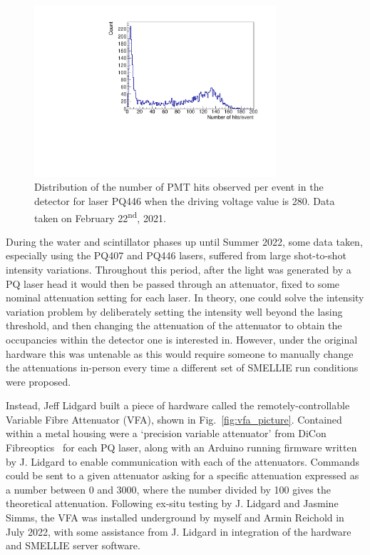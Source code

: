 \begin{figure}
    \centering
    \includegraphics[width=0.8\textwidth]{3_SMELLIEHardware/images/run_268221_8_nhit_dist.pdf}
    \caption[Distribution of the number of PMT hits observed per event for laser PQ446]
    {Distribution of the number of PMT hits observed per event in the detector for laser PQ446 when the driving voltage value is 280. Data taken on February 22\textsuperscript{nd}, 2021.}
    \label{fig:pq_threshold_intensity_variation}
\end{figure}

During the water and scintillator phases up until Summer 2022, some data taken, especially using the PQ407 and PQ446 lasers, suffered from large shot-to-shot intensity variations. Throughout this period, after the light was generated by a PQ laser head it would then be passed through an attenuator, fixed to some nominal attenuation setting for each laser. In theory, one could solve the intensity variation problem by deliberately setting the intensity well beyond the lasing threshold, and then changing the attenuation of the attenuator to obtain the occupancies within the detector one is interested in. However, under the original hardware this was untenable as this would require someone to manually change the attenuations in-person every time a different set of SMELLIE run conditions were proposed.

Instead, Jeff Lidgard built a piece of hardware called the remotely-controllable Variable Fibre Attenuator (VFA), shown in Fig.~\ref{fig:vfa_picture}. Contained within a metal housing were a `precision variable attenuator' from DiCon Fibreoptics~\cite{diconfibreoptics30dBPrecisionVariable2017} %
for each PQ laser, along with an Arduino running firmware written by J. Lidgard to enable communication with each of the attenuators. Commands could be sent to a given attenuator asking for a specific attenuation expressed as a number between 0 and 3000, where the number divided by 100 gives the theoretical attenuation. Following ex-situ testing by J. Lidgard and Jasmine Simms, the VFA was installed underground by myself and Armin Reichold in July 2022, with some assistance from J. Lidgard in integration of the hardware and SMELLIE server software.

